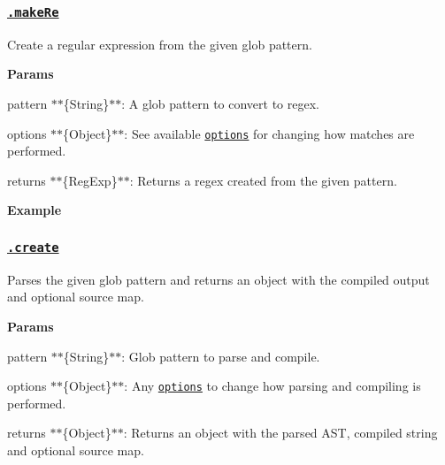 \subsubsection*{\href{index.js#L595}{\tt .make\+Re}}

Create a regular expression from the given glob {\ttfamily pattern}.

{\bfseries Params}


\begin{DoxyItemize}
\item {\ttfamily pattern} $\ast$$\ast$\{String\}$\ast$$\ast$\+: A glob pattern to convert to regex.
\item {\ttfamily options} $\ast$$\ast$\{Object\}$\ast$$\ast$\+: See available \href{#options}{\tt options} for changing how matches are performed.
\item {\ttfamily returns} $\ast$$\ast$\{Reg\+Exp\}$\ast$$\ast$\+: Returns a regex created from the given pattern.
\end{DoxyItemize}

{\bfseries Example}




\subsubsection*{\href{index.js#L658}{\tt .create}}

Parses the given glob {\ttfamily pattern} and returns an object with the compiled {\ttfamily output} and optional source {\ttfamily map}.

{\bfseries Params}


\begin{DoxyItemize}
\item {\ttfamily pattern} $\ast$$\ast$\{String\}$\ast$$\ast$\+: Glob pattern to parse and compile.
\item {\ttfamily options} $\ast$$\ast$\{Object\}$\ast$$\ast$\+: Any \href{#options}{\tt options} to change how parsing and compiling is performed.
\item {\ttfamily returns} $\ast$$\ast$\{Object\}$\ast$$\ast$\+: Returns an object with the parsed A\+ST, compiled string and optional source map.
\end{DoxyItemize}

